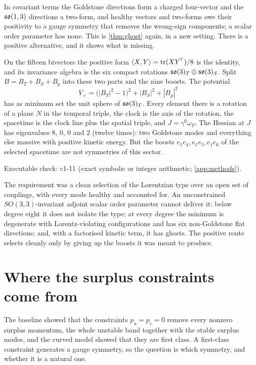 In covariant terms the Goldstone directions form a charged four-vector and the $\mathfrak{so}(1,3)$ directions a two-form, and healthy vectors and two-forms owe their positivity to a
gauge symmetry that removes the wrong-sign components; a scalar order parameter has none. This is \cref{thm:ghost} again, in a new setting. There is a positive
alternative, and it shows what is missing.

\begin{proposition}
\label{prop:positivealt}
On the fifteen bivectors the positive form $\langle X,Y\rangle=\operatorname{tr}(XY^{\!\top})/8$ is the identity, and its invariance algebra is the six compact rotations $\mathfrak{so}(3)_T\oplus\mathfrak{so}(3)_S$.
Split $B=B_T+B_S+B_p$ into these two parts and the nine boosts. The potential
\[
V_+=\bigl(|B_T|^2-1\bigr)^2+|B_S|^2+|B_p|^2
\]
has as minimum set the unit sphere of $\mathfrak{so}(3)_T$. Every element there is a rotation of a plane $N$ in the temporal triple, the clock is the axis of the rotation, the spacetime is the
clock line plus the spatial triple, and $J=\gamma^0\omega_T$. The Hessian at $J$ has eigenvalues $8$, $0$, $0$ and $2$ (twelve times): two Goldstone modes and everything else massive
with positive kinetic energy. But the boosts $e_1e_4,e_1e_5,e_1e_6$ of the selected spacetime are not symmetries of this sector.
\end{proposition}

\noindent Executable check: c1-11 (exact symbolic or integer arithmetic; \cref{app:methods}).

The requirement was a clean selection of the Lorentzian type over an open set of couplings, with every mode healthy and accounted for. An unconstrained $SO(3,3)$-invariant adjoint scalar
order parameter cannot deliver it: below degree eight it does not isolate the type; at every degree the minimum is degenerate with Lorentz-violating configurations and has
six non-Goldstone flat directions; and, with a factorised kinetic term, it has ghosts. The positive route selects cleanly only by giving up the boosts it was meant to produce.



\section{Where the surplus constraints come from}
\label{sec:constraints}

The baseline showed that the constraints $p_u=p_v=0$ remove every nonzero surplus momentum, the whole unstable band together with the stable
surplus modes, and the curved model showed that they are first class. A first-class constraint
generates a gauge symmetry, so the question is which symmetry, and whether it is a natural one.

